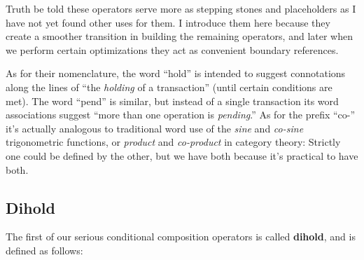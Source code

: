 \documentclass[twoside]{article}
\newcommand{\strong}[1]{{\bfseries #1}}
\begin{document}
Truth be told these operators serve more as stepping stones and placeholders as I have not yet found other uses
for them. I introduce them here because they create a smoother transition in building the remaining operators,
and later when we perform certain optimizations they act as convenient boundary references.

As for their nomenclature, the word ``hold'' is intended to suggest connotations along the lines of
``the \emph{holding} of a transaction'' (until certain conditions are met). The word ``pend'' is similar,
but instead of a single transaction its word associations suggest ``more than one operation is \emph{pending}.''
As for the prefix ``co-'' it's actually analogous to traditional word use of the \emph{sine} and \emph{co-sine}
trigonometric functions, or \emph{product} and \emph{co-product} in category theory: Strictly one could be
defined by the other, but we have both because it's practical to have both.

\subsection*{Dihold}

The first of our serious conditional composition operators is called \strong{dihold}, and is defined as follows:
\ \\
\end{document}
